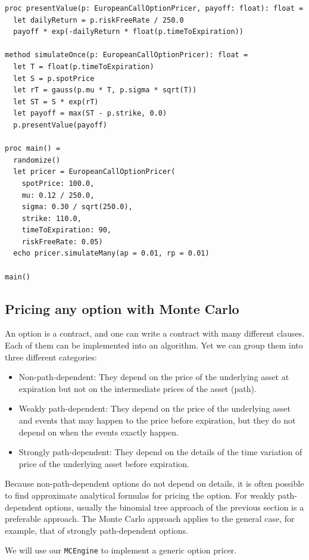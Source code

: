 \documentclass[justified, sixbynine]{tufte-book}
\def\ft{\small\tt}
\theoremstyle{plain}%
\newtheorem * {corollary}{Corollary}
\theoremstyle{definition}
\theoremstyle{remark}
\newtheorem * {remark}{Remark}
\newtheorem * {note}{Note}
\begin{document}
\begin{fullwidth}
\begin{lstlisting}[caption={in file: {\ft options.nim}}]
proc presentValue(p: EuropeanCallOptionPricer, payoff: float): float =
  let dailyReturn = p.riskFreeRate / 250.0
  payoff * exp(-dailyReturn * float(p.timeToExpiration))

method simulateOnce(p: EuropeanCallOptionPricer): float =
  let T = float(p.timeToExpiration)
  let S = p.spotPrice
  let rT = gauss(p.mu * T, p.sigma * sqrt(T))
  let ST = S * exp(rT)
  let payoff = max(ST - p.strike, 0.0)
  p.presentValue(payoff)

proc main() =
  randomize()
  let pricer = EuropeanCallOptionPricer(
    spotPrice: 100.0,
    mu: 0.12 / 250.0,
    sigma: 0.30 / sqrt(250.0),
    strike: 110.0,
    timeToExpiration: 90,
    riskFreeRate: 0.05)
  echo pricer.simulateMany(ap = 0.01, rp = 0.01)

main()
\end{lstlisting}

\goodbreak\subsection{Pricing any option with Monte Carlo}

An option is a contract, and one can write a contract with many different clauses. Each of them can be implemented into an algorithm. Yet we can group them into three different categories:
\begin{itemize}
\item Non-path-dependent: They depend on the price of the underlying asset at expiration but not on the intermediate prices of the asset (path).
\item Weakly path-dependent: They depend on the price of the underlying asset and events that may happen to the price before expiration, but they do not depend on when the events exactly happen.
\item Strongly path-dependent: They depend on the details of the time variation of price of the underlying asset before expiration.
\end{itemize}

 Because non-path-dependent options do not depend on details, it is often possible to find approximate analytical formulas for pricing the option. For weakly path-dependent options, usually the binomial tree approach of the previous section is a preferable approach. The Monte Carlo approach applies to the general case, for example, that of strongly path-dependent options.

We will use our {\ft MCEngine} to implement a generic option pricer.


\end{fullwidth}
\end{document}
